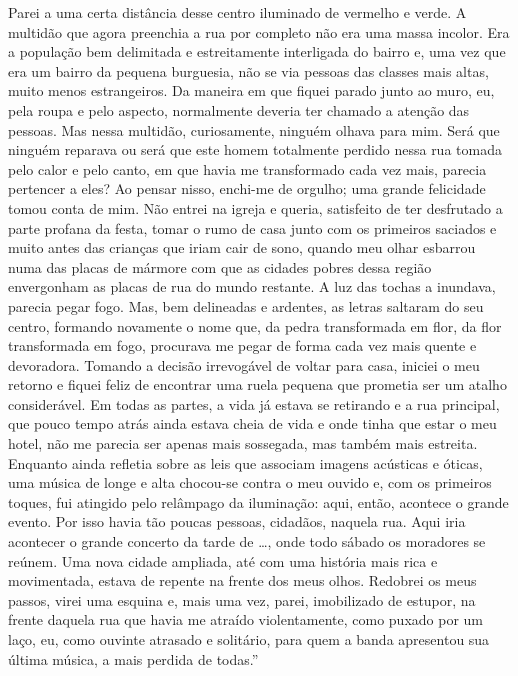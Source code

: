 Parei a uma certa distância desse centro iluminado de vermelho e verde.
A multidão que agora preenchia a rua por completo não era uma massa
incolor. Era a população bem delimitada e estreitamente interligada do
bairro e, uma vez que era um bairro da pequena burguesia, não se via
pessoas das classes mais altas, muito menos estrangeiros. Da maneira em
que fiquei parado junto ao muro, eu, pela roupa e pelo aspecto,
normalmente deveria ter chamado a atenção das pessoas. Mas nessa
multidão, curiosamente, ninguém olhava para mim. Será que ninguém
reparava ou será que este homem totalmente perdido nessa rua tomada pelo
calor e pelo canto, em que havia me transformado cada vez mais, parecia
pertencer a eles? Ao pensar nisso, enchi-me de orgulho; uma grande
felicidade tomou conta de mim. Não entrei na igreja e queria, satisfeito
de ter desfrutado a parte profana da festa, tomar o rumo de casa junto
com os primeiros saciados e muito antes das crianças que iriam cair de
sono, quando meu olhar esbarrou numa das placas de mármore com que as
cidades pobres dessa região envergonham as placas de rua do mundo
restante. A luz das tochas a inundava, parecia pegar fogo. Mas, bem
delineadas e ardentes, as letras saltaram do seu centro, formando
novamente o nome que, da pedra transformada em flor, da flor
transformada em fogo, procurava me pegar de forma cada vez mais quente e
devoradora. Tomando a decisão irrevogável de voltar para casa, iniciei o
meu retorno e fiquei feliz de encontrar uma ruela pequena que prometia
ser um atalho considerável. Em todas as partes, a vida já estava se
retirando e a rua principal, que pouco tempo atrás ainda estava cheia de
vida e onde tinha que estar o meu hotel, não me parecia ser apenas mais
sossegada, mas também mais estreita. Enquanto ainda refletia sobre as
leis que associam imagens acústicas e óticas, uma música de %
longe e alta
chocou-se contra o meu ouvido e, com os primeiros toques, fui atingido
pelo relâmpago da iluminação: aqui, então, acontece o grande evento. Por
isso havia tão poucas pessoas, cidadãos, naquela rua. Aqui iria
acontecer o grande concerto da tarde de \ldots{}, onde todo sábado os
moradores se reúnem. Uma nova cidade ampliada, até com uma história mais
rica e movimentada, estava de repente na frente dos meus olhos. Redobrei
os meus passos, virei uma esquina e, mais uma vez, parei, imobilizado de
estupor, na frente daquela rua que havia me atraído violentamente, como
puxado por um laço, eu, como ouvinte atrasado e solitário, para quem a
banda apresentou sua última música, a mais perdida de todas.''

